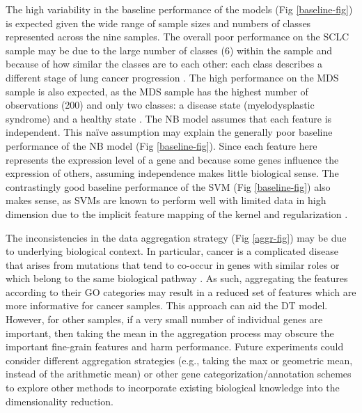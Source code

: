 \documentclass{article}
\begin{document}
The high variability in the baseline performance of the models (Fig \ref{baseline-fig}) is expected given the wide range of sample sizes and numbers of classes represented across the nine samples. The overall poor performance on the SCLC sample may be due to the large number of classes (6) within the sample and because of how similar the classes are to each other: each class describes a different stage of lung cancer progression \cite{SCLC_paper}. The high performance on the MDS sample is also expected, as the MDS sample has the highest number of observations (200) and only two classes: a disease state (myelodysplastic syndrome) and a healthy state \cite{MDS_paper}. The NB model assumes that each feature is independent. This na\"ive assumption may explain the generally poor baseline performance of the NB model (Fig \ref{baseline-fig}). Since each feature here represents the expression level of a gene and because some genes influence the expression of others, assuming independence makes little biological sense. The contrastingly good baseline performance of the SVM (Fig \ref{baseline-fig}) also makes sense, as SVMs are known to perform well with limited data in high dimension due to the implicit feature mapping of the kernel and regularization \cite{SVM_chapter}.

The inconsistencies in the data aggregation strategy (Fig \ref{aggr-fig}) may be due to underlying biological context. In particular, cancer is a complicated disease that arises from mutations that tend to co-occur in genes with similar roles or which belong to the same biological pathway \cite{CancerPaper}. As such, aggregating the features according to their GO categories may result in a reduced set of features which are more informative for cancer samples. This approach can aid the DT model. However, for other samples, if a very small number of individual genes are important, then taking the mean in the aggregation process may obscure the important fine-grain features and harm performance. Future experiments could consider different aggregation strategies (e.g., taking the max or geometric mean, instead of the arithmetic mean) or other gene categorization/annotation schemes to explore other methods to incorporate existing biological knowledge into the dimensionality reduction.
\end{document}
